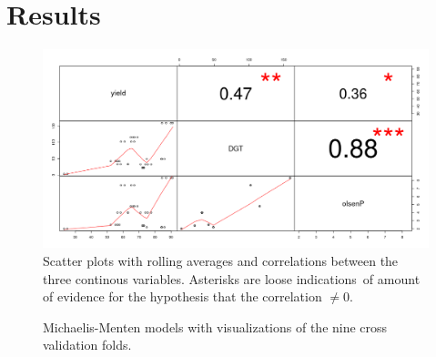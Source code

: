 \documentclass[11pt,fleqn]{article}
\begin{document}
\section{Results}
\begin{figure}[H]
	\centering
	\includegraphics[width=.7\linewidth]{p2_corrplot}
	\caption{Scatter plots with rolling averages and correlations between the three continous variables. Asterisks are loose indications\protect\footnotemark\ of amount of evidence for the hypothesis that the correlation \(\neq 0\).}
\end{figure}
\begin{figure}[H]
	\centering
{}
	\label{fig:yield_bio}
\caption{Michaelis-Menten models with visualizations of the nine cross validation folds.}
\end{figure}
\end{document}
